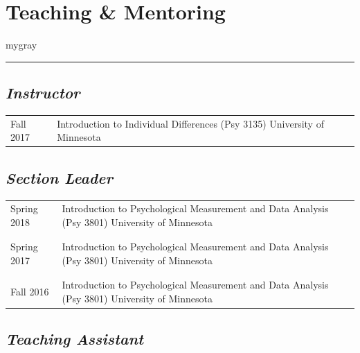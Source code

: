 \documentclass[
]{article}
\begin{document}
\hypertarget{teaching-mentoring}{%
\section{\texorpdfstring{\textbf{Teaching \&
Mentoring}}{Teaching \& Mentoring}}\label{teaching-mentoring}}

\vspace{1ex}
\begin{color}{mygray}\hrule\end{color}
\vspace{1ex}

\hypertarget{instructor}{%
\subsection{\texorpdfstring{\emph{Instructor}}{Instructor}}\label{instructor}}

\begin{longtable}{p{2.25cm}p{5.5in}}
 Fall 2017 & Introduction to Individual Differences (Psy 3135) \newline University of Minnesota \\
\end{longtable}

\hypertarget{section-leader}{%
\subsection{\texorpdfstring{\emph{Section
Leader}}{Section Leader}}\label{section-leader}}

\begin{longtable}{p{2.25cm}p{5.5in}}
 Spring 2018 & Introduction to Psychological Measurement and Data Analysis (Psy 3801) \newline University of Minnesota \\\\& \\
 Spring 2017 & Introduction to Psychological Measurement and Data Analysis (Psy 3801) \newline University of Minnesota \\\\& \\
 Fall 2016 & Introduction to Psychological Measurement and Data Analysis (Psy 3801) \newline University of Minnesota \\
\end{longtable}

\hypertarget{teaching-assistant}{%
\subsection{\texorpdfstring{\emph{Teaching
Assistant}}{Teaching Assistant}}\label{teaching-assistant}}
\end{document}
